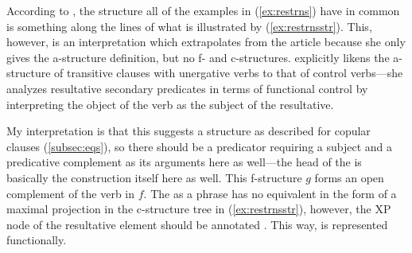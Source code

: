 According to \citet{simpson1983}, the structure all of the examples in
(\ref{ex:restrns}) have in common is something along the lines of what is
illustrated by (\ref{ex:restrnsstr}). This, however, is an interpretation which
extrapolates from the article because she only gives the a-structure
definition, but no f- and c-structures. \citet{simpson1983} explicitly likens
the a-structure of transitive clauses with unergative verbs to that of
control verbs---she analyzes resultative secondary predicates in terms of
functional control by interpreting the object of the verb as the subject of the
resultative.

My interpretation is that this suggests a structure as described for copular
clauses (\autoref{subsec:eqs}), so there should be a  predicator
requiring a subject and a predicative complement as its arguments here as
well---the head of the \XCompl{} is basically the construction itself here as
well. This f-structure $g$ forms an open complement of the verb in $f$. The
\XCompl{} as a phrase has no equivalent in the form of a maximal projection in
the c-structure tree in (\ref{ex:restrnsstr}), however, the XP node of the
resultative element should be annotated \pass{\XCompl{} \Plink}. This way,
\XCompl{} is represented functionally.

